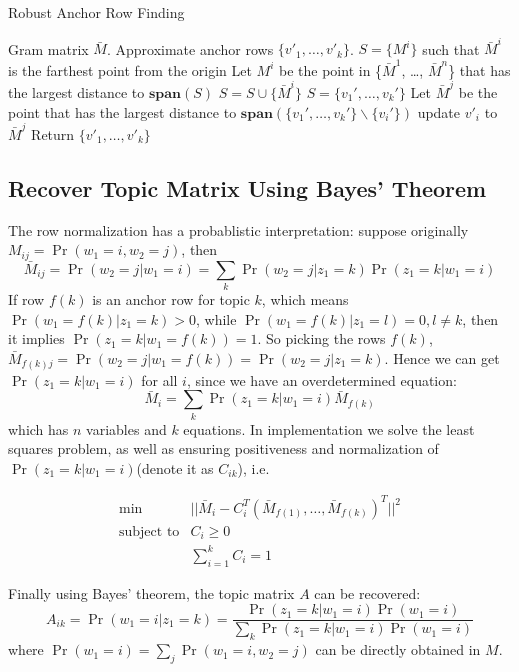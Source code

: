 \documentclass{article}
\def\spn{\mathbf{span}}
\begin{document}
\begin{algorithm}[H]
\caption{Robust Anchor Row Finding}
\begin{algorithmic}[1]
 Gram matrix $\bar{M}$.
 Approximate anchor rows $\{ v'_1, \ldots, v'_k \}$.
\STATE $S = \{M^i\}$ such that $\bar{M}^i$ is the farthest point from the origin
\STATE    Let $M^i$ be the point in \{$\bar{M}^1$, \ldots, $\bar{M}^n$\} that has the largest distance to $\spn(S)$
\STATE     $S = S \cup \{ \bar{M}^i \}$
\ENDFOR
\STATE $S = \{v_1', \ldots, v_k'\}$
\STATE     Let $\bar{M}^j$ be the point that has the largest distance to $\spn(\{v_1', \ldots, v_k'\} \backslash \{ v_i' \})$
\STATE    update $v'_i$ to $\bar{M}^j$
\ENDFOR
\STATE Return $\{ v'_1, \ldots, v'_k \}$
\end{algorithmic}
\end{algorithm}


\subsection{Recover Topic Matrix Using Bayes' Theorem}
The row normalization has a probablistic interpretation: suppose originally $M_{ij} = \Pr(w_1 = i, w_2 = j)$, then 
$$
    \bar{M}_{ij} = \Pr(w_2 = j | w_1 = i) = \sum_k \Pr(w_2 = j | z_1 = k) \Pr(z_1 = k | w_1 = i)
$$
If row $f(k)$ is an anchor row for topic $k$, which means $\Pr(w_1 = f(k) | z_1 = k) > 0$, while $\Pr(w_1 = f(k) | z_1 = l) = 0, l \neq k$, then it implies $\Pr(z_1 = k | w_1 = f(k)) = 1$.
So picking the rows $f(k)$, $\bar{M}_{f(k)j} = \Pr(w_2 = j | w_1 = f(k)) = \Pr(w_2 = j | z_1 = k)$.
Hence we can get $\Pr(z_1 = k | w_1 = i)$ for all $i$, since we have an overdetermined equation:
$$
    \bar{M}_i = \sum_k \Pr(z_1 = k | w_1 = i) \bar{M}_{f(k)}
$$
which has $n$ variables and $k$ equations.
In implementation we solve the least squares problem, as well as ensuring positiveness and normalization of $\Pr(z_1 = k | w_1 = i)$(denote it as $C_{ik}$), i.e.

\begin{align*}
\min & ||\bar{M}_i - C_i^T(\bar{M}_{f(1)}, \ldots, \bar{M}_{f(k)})^T||^2 \\
\text{subject to}  & C_i \ge 0 \\
           & \sum_{i=1}^k C_i = 1 
\end{align*}

Finally using Bayes' theorem, the topic matrix $A$ can be recovered:
$$
A_{ik} = \Pr(w_1 = i | z_1 = k) = \frac{\Pr(z_1 = k | w_1 = i) \Pr(w_1 = i)}{\sum_k \Pr(z_1 = k | w_1 = i) \Pr(w_1 = i)}
$$
where $\Pr(w_1 = i) = \sum_j \Pr(w_1 = i, w_2 = j)$ can be directly obtained in $M$.
\end{document}
